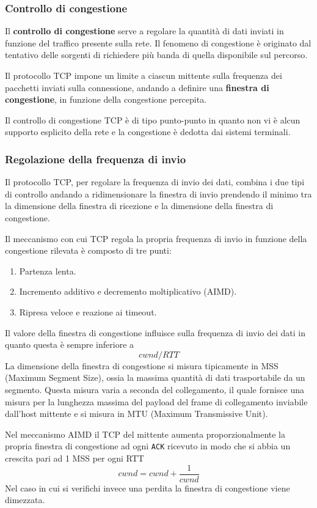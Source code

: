 \subsubsection{Controllo di congestione}
Il \textbf{controllo di congestione} serve a regolare la quantità di dati inviati in funzione del
traffico presente sulla rete. Il fenomeno di congestione è originato dal tentativo delle sorgenti
di richiedere più banda di quella disponibile sul percorso.

Il protocollo TCP impone un limite a ciascun mittente sulla frequenza dei pacchetti inviati sulla
connessione, andando a definire una \textbf{finestra di congestione}, in funzione della
congestione percepita.

Il controllo di congestione TCP è di tipo punto-punto in quanto non vi è alcun supporto esplicito
della rete e la congestione è dedotta dai sistemi terminali.

\subsubsection{Regolazione della frequenza di invio}
Il protocollo TCP, per regolare la frequenza di invio dei dati, combina i due tipi di controllo
andando a ridimensionare la finestra di invio prendendo il minimo tra la dimensione della finestra
di ricezione e la dimensione della finestra di congestione.

Il meccanismo con cui TCP regola la propria frequenza di invio in funzione della congestione 
rilevata è composto di tre punti:
\begin{enumerate}
	\item Partenza lenta.
	\item Incremento additivo e decremento moltiplicativo (AIMD).
	\item Ripresa veloce e reazione ai timeout.
\end{enumerate}
Il valore della finestra di congestione influisce sulla frequenza di invio dei dati in quanto 
questa è sempre inferiore a
\[ cwnd / RTT \]
La dimensione della finestra di congestione si misura tipicamente in MSS (Maximum Segment Size),
ossia la massima quantità di dati trasportabile da un segmento. Questa misura varia a seconda del
collegamento, il quale fornisce una misura per la lunghezza massima del payload del frame di 
collegamento inviabile dall'host mittente e si misura in MTU (Maximum Transmissive Unit).

Nel meccanismo AIMD il TCP del mittente aumenta proporzionalmente la propria finestra di 
congestione ad ogni \verb|ACK| ricevuto in modo che si abbia un crescita pari ad 1 MSS per ogni 
RTT
\[ cwnd = cwnd + \frac{1}{cwnd} \]
Nel caso in cui si verifichi invece una perdita la finestra di congestione viene dimezzata.

